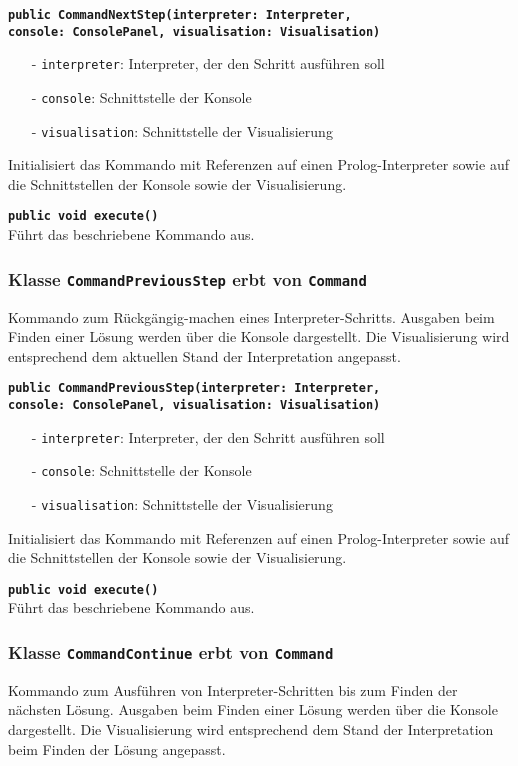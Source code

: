 \documentclass[parskip=full,11pt,twoside]{scrartcl}
\begin{document}
\textbf{\texttt{public CommandNextStep(interpreter: Interpreter,\\console: ConsolePanel, visualisation: Visualisation)}}\\
\begin{itemize}[noitemsep]
	\item[-] \texttt{interpreter}: Interpreter, der den Schritt ausführen soll
	\item[-] \texttt{console}: Schnittstelle der Konsole
	\item[-] \texttt{visualisation}: Schnittstelle der Visualisierung
\end{itemize}
Initialisiert das Kommando mit Referenzen auf einen Prolog-Interpreter sowie auf die Schnittstellen der Konsole sowie der Visualisierung.

\textbf{\texttt{public void execute()}}\\
Führt das beschriebene Kommando aus.

\subsubsection{Klasse \texttt{CommandPreviousStep} erbt von \texttt{Command}}
Kommando zum Rückgängig-machen eines Interpreter-Schritts. Ausgaben beim Finden einer Lösung werden über die Konsole dargestellt. Die Visualisierung wird entsprechend dem aktuellen Stand der Interpretation angepasst.

\textbf{\texttt{public CommandPreviousStep(interpreter: Interpreter,\\console: ConsolePanel, visualisation: Visualisation)}}\\
\begin{itemize}[noitemsep]
	\item[-] \texttt{interpreter}: Interpreter, der den Schritt ausführen soll
	\item[-] \texttt{console}: Schnittstelle der Konsole
	\item[-] \texttt{visualisation}: Schnittstelle der Visualisierung
\end{itemize}
Initialisiert das Kommando mit Referenzen auf einen Prolog-Interpreter sowie auf die Schnittstellen der Konsole sowie der Visualisierung.

\textbf{\texttt{public void execute()}}\\
Führt das beschriebene Kommando aus.

\subsubsection{Klasse \texttt{CommandContinue} erbt von \texttt{Command}}
Kommando zum Ausführen von Interpreter-Schritten bis zum Finden der nächsten Lösung. Ausgaben beim Finden einer Lösung werden über die Konsole dargestellt. Die Visualisierung wird entsprechend dem Stand der Interpretation beim Finden der Lösung angepasst.
\end{document}
